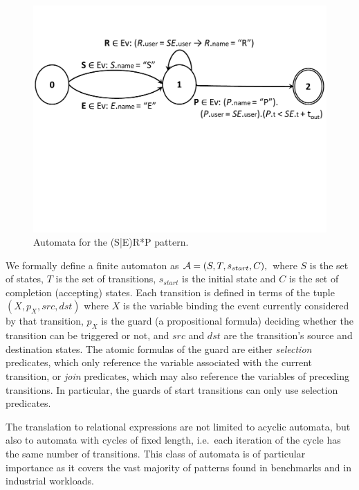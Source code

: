 \begin{figure}[t]
	\centering
	\includegraphics[clip, trim=0cm 10cm 0cm 3cm,width=\columnwidth]
	{graphs/example_sm3.pdf}
	\caption{Automata for the (S|E)R*P pattern.}
	\label{fig:serp_pattern}
\end{figure}


We formally define a finite automaton as $\mathcal{A} = (S, T, s_{start}, C),$ 
where $S$ is the set of states, $T$ is the set of transitions, $s_{start}$ is 
the initial state and $C$ is the set of completion (accepting) states.
Each transition is defined in terms of the tuple $(X, p_X, src, dst)$ where $X$ 
is the variable binding the event currently considered by that transition, 
$p_X$ is the guard (a propositional formula) 
deciding whether the transition can be triggered or not, and $src$ and $dst$ 
are the transition's source and destination states.  
The atomic formulas of the guard are either {\em selection} predicates, which 
only reference the variable associated with the current transition,
or {\em join} predicates, which may also reference the variables of preceding 
transitions.
In particular, the guards of start transitions can only use selection 
predicates.  


The translation to relational expressions are not limited to 
acyclic automata, but also to automata with cycles of fixed length, 
i.e.\ each iteration of the cycle has the same number of transitions.
This class of automata is of particular importance as it covers the 
vast majority of patterns found in benchmarks and in industrial workloads.  





